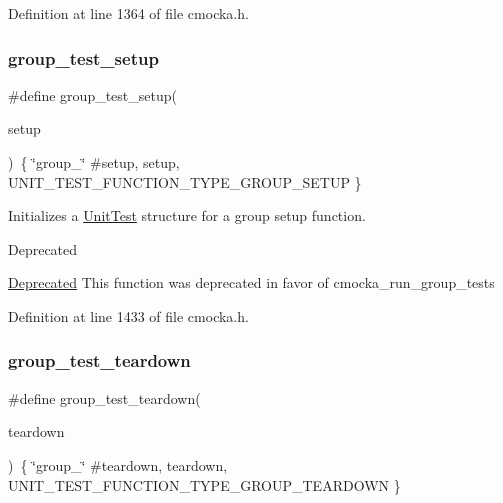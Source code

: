 Definition at line 1364 of file cmocka.\+h.

\mbox{\label{group__cmocka__exec_ga246dbcbb338e4becbfef009b2bb14b78}} 
\subsubsection{\texorpdfstring{group\+\_\+test\+\_\+setup}{group\_test\_setup}}
{\footnotesize\ttfamily \#define group\+\_\+test\+\_\+setup(\begin{DoxyParamCaption}\item[{}]{setup }\end{DoxyParamCaption})~\{ \char`\"{}group\+\_\+\char`\"{} \#setup, setup, U\+N\+I\+T\+\_\+\+T\+E\+S\+T\+\_\+\+F\+U\+N\+C\+T\+I\+O\+N\+\_\+\+T\+Y\+P\+E\+\_\+\+G\+R\+O\+U\+P\+\_\+\+S\+E\+T\+UP \}}

Initializes a \hyperlink{structUnitTest}{Unit\+Test} structure for a group setup function.

\begin{DoxyRefDesc}{Deprecated}
\item[\hyperlink{deprecated__deprecated000004}{Deprecated}]This function was deprecated in favor of cmocka\+\_\+run\+\_\+group\+\_\+tests \end{DoxyRefDesc}


Definition at line 1433 of file cmocka.\+h.

\mbox{\label{group__cmocka__exec_ga03159d4169e85cb92bb0eba97cfcf18d}} 
\subsubsection{\texorpdfstring{group\+\_\+test\+\_\+teardown}{group\_test\_teardown}}
{\footnotesize\ttfamily \#define group\+\_\+test\+\_\+teardown(\begin{DoxyParamCaption}\item[{}]{teardown }\end{DoxyParamCaption})~\{ \char`\"{}group\+\_\+\char`\"{} \#teardown, teardown, U\+N\+I\+T\+\_\+\+T\+E\+S\+T\+\_\+\+F\+U\+N\+C\+T\+I\+O\+N\+\_\+\+T\+Y\+P\+E\+\_\+\+G\+R\+O\+U\+P\+\_\+\+T\+E\+A\+R\+D\+O\+WN \}}


